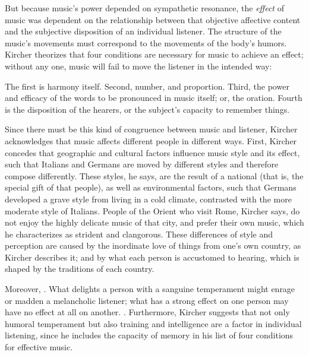 But because music's power depended on sympathetic resonance, the \emph{effect}
of music was dependent on the relationship between that objective affective
content and the subjective disposition of an individual listener.
The structure of the music's movements must correspond to the movements of the
body's humors.
Kircher theorizes that four conditions are necessary for music to achieve an
effect; without any one, music will fail to move the listener in the intended
way:
\begin{quoting}
    The first is harmony itself. Second, number, and proportion. Third, the
    power and efficacy of the words to be pronounced in music itself; or, the
    oration.
    Fourth is the disposition of the hearers, or the subject's capacity to
    remember things.%
        \Autocite[550]{Kircher:Musurgia}
\end{quoting}
Since there must be this kind of congruence between music and listener, Kircher
acknowledges that music affects different people in different ways.
First, Kircher concedes that geographic and cultural factors influence music
style and its effect, such that Italians and Germans are moved by different
styles and therefore compose differently.
These styles, he says, are the result of a national  (that is,
the special gift of that people), as well as environmental factors, such that
Germans developed a grave style from living in a cold climate, contrasted with
the more moderate style of Italians.
People of the Orient who visit Rome, Kircher says, do not enjoy the highly
delicate music of that city, and prefer their own music, which he characterizes
as strident and clangorous.
These differences of style and perception are caused by the inordinate love of
things from one's own country, as Kircher describes it; and by what each person
is accustomed to hearing, which is shaped by the traditions of each country.%
    \Autocites[543--544]{Kircher:Musurgia}

Moreover, .%
    \Autocite[544]{Kircher:Musurgia}
What delights a person with a sanguine temperament might enrage or madden a
melancholic listener; what has a strong effect on one person may have no effect
at all on another.
.%
    \Autocite[550]{Kircher:Musurgia}
Furthermore, Kircher suggests that not only humoral temperament but also
training and intelligence are a factor in individual listening, since he
includes the capacity of memory in his list of four conditions for effective
music.

